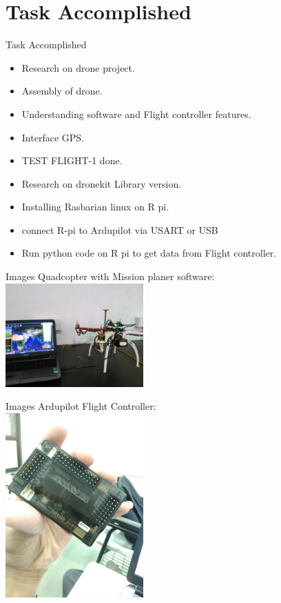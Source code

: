 \documentclass[10pt, a4paper]{beamer}
\begin{document}
\section{Task Accomplished}
\begin{frame}{Task Accomplished}
	\begin{itemize}
	    \item Research on drone project.
		\item Assembly of drone.
		\item Understanding software and Flight controller features.
		\item Interface GPS.
		\item TEST FLIGHT-1 done.
		\item Research on dronekit Library version.
		\item Installing Rasbarian linux on R pi.
		\item connect R-pi to Ardupilot via USART or USB
		\item Run python code on R pi to get data from Flight controller.
	\end{itemize}
\end{frame}

\begin{frame}{Images}
	Quadcopter with Mission planer software: \\
	\centering
		\includegraphics[width =200px]{qd1}

\end{frame}



\begin{frame}{Images}
	Ardupilot Flight Controller: \\
	    \centering
		\includegraphics[width =200px]{fc}
\end{frame}
\end{document}

